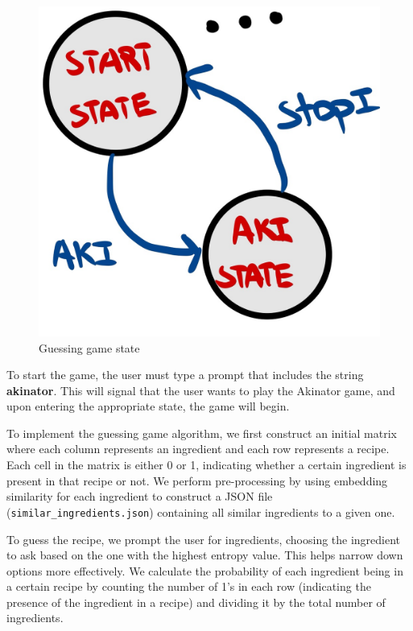 \documentclass[runningheads]{llncs}
\begin{document}
\begin{figure}[!htbp]
    \center
    \includegraphics[scale=0.1]{images/aki}
    \caption{Guessing game state}
    \label{automz}
\end{figure}
To start the game, the user must type a prompt that includes the string \textbf{akinator}. This will signal that the user wants to play the Akinator game, and upon entering the appropriate state, the game will begin.

To implement the guessing game algorithm, we first construct an initial matrix where each column represents an ingredient and each row represents a recipe. Each cell in the matrix is either 0 or 1, indicating whether a certain ingredient is present in that recipe or not. We perform pre-processing by using embedding similarity for each ingredient to construct a JSON file (\texttt{similar\_ingredients.json}) containing all similar ingredients to a given one.

To guess the recipe, we prompt the user for ingredients, choosing the ingredient to ask based on the one with the highest entropy value. This helps narrow down options more effectively. We calculate the probability of each ingredient being in a certain recipe by counting the number of 1's in each row (indicating the presence of the ingredient in a recipe) and dividing it by the total number of ingredients.
\end{document}
